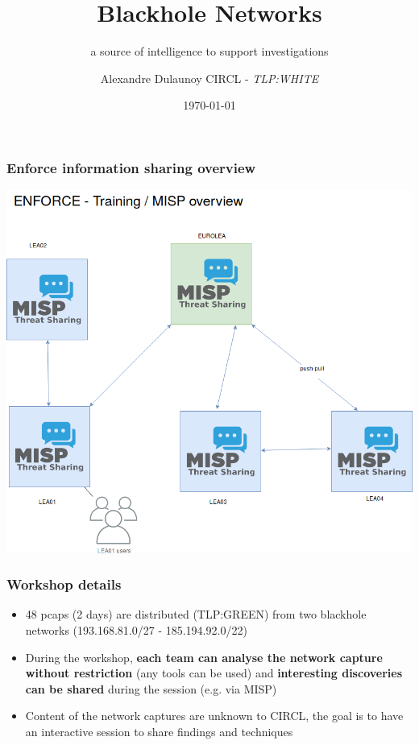 \documentclass{beamer}
\author{Alexandre Dulaunoy CIRCL - \emph{TLP:WHITE}}
\title{Blackhole Networks}
\subtitle{a source of intelligence to support investigations}
\institute{Team CIRCL}
\date{\today}
\begin{document}
\begin{frame}[t,plain]
\titlepage
\end{frame}

\begin{frame}
        \frametitle{Enforce information sharing overview}
        \includegraphics[scale=0.28]{enforce-misp.png}
\end{frame}

\begin{frame}
\frametitle{Workshop details}
\begin{itemize}
        \item 48 pcaps (2 days) are distributed (TLP:GREEN) from two blackhole networks (193.168.81.0/27 - 185.194.92.0/22)
        \item During the workshop, {\bf each team can analyse the network capture without restriction} (any tools can be used) and {\bf interesting discoveries can be shared} during the session (e.g. via MISP)
        \item Content of the network captures are unknown to CIRCL, the goal is to have an interactive session to share findings and techniques
\end{itemize}
\end{frame}
\end{document}
